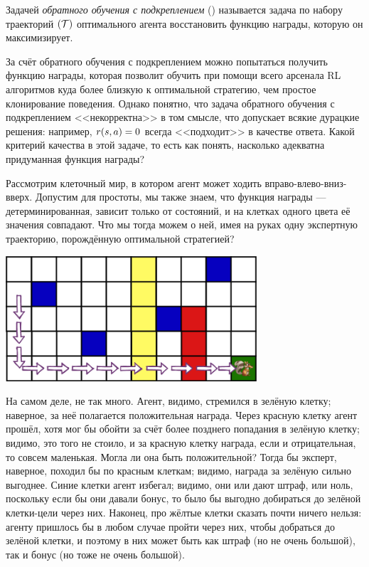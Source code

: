 \begin{definition}
Задачей \emph{обратного обучения с подкреплением} () называется задача по набору траекторий $(\mathcal{T})$ оптимального агента восстановить функцию награды, которую он максимизирует.
\end{definition}

За счёт обратного обучения с подкреплением можно попытаться получить функцию награды, которая позволит обучить при помощи всего арсенала RL алгоритмов куда более близкую к оптимальной стратегию, чем простое клонирование поведения. Однако понятно, что задача обратного обучения с подкреплением <<некорректна>> в том смысле, что допускает всякие дурацкие решения: например, $r(s, a) \HM= 0$ всегда <<подходит>> в качестве ответа. Какой критерий качества в этой задаче, то есть как понять, насколько адекватна придуманная функция награды?

\begin{example}
Рассмотрим клеточный мир, в котором агент может ходить вправо-влево-вниз-вверх. Допустим для простоты, мы также знаем, что функция награды --- детерминированная, зависит только от состояний, и на клетках одного цвета её значения совпадают. Что мы тогда можем о ней, имея на руках одну экспертную траекторию, порождённую оптимальной стратегией?
\begin{center}
    \includegraphics[width=0.7\textwidth]{Images/IRL.png}
\end{center}
На самом деле, не так много. Агент, видимо, стремился в зелёную клетку; наверное, за неё полагается положительная награда. Через красную клетку агент прошёл, хотя мог бы обойти за счёт более позднего попадания в зелёную клетку; видимо, это того не стоило, и за красную клетку награда, если и отрицательная, то совсем маленькая. Могла ли она быть положительной? Тогда бы эксперт, наверное, походил бы по красным клеткам; видимо, награда за зелёную сильно выгоднее. Синие клетки агент избегал; видимо, они или дают штраф, или ноль, поскольку если бы они давали бонус, то было бы выгодно добираться до зелёной клетки-цели через них. Наконец, про жёлтые клетки сказать почти ничего нельзя: агенту пришлось бы в любом случае пройти через них, чтобы добраться до зелёной клетки, и поэтому в них может быть как штраф (но не очень большой), так и бонус (но тоже не очень большой).
\end{example}

